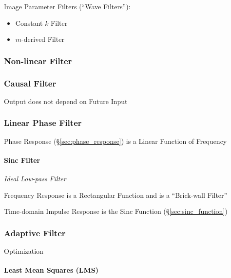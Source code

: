 Image Parameter Filters (``Wave Filters''):
\begin{itemize}
  \item Constant $k$ Filter
  \item $m$-derived Filter
\end{itemize}



\subsubsection{Non-linear Filter}\label{sec:nonlinear_filter}

\subsubsection{Causal Filter}\label{sec:causal_filter}

Output does not depend on Future Input



\subsubsection{Linear Phase Filter}\label{sec:linear_phase}

Phase Response (\S\ref{sec:phase_response}) is a Linear Function of Frequency



\paragraph{Sinc Filter}\label{sec:sinc_filter}\hfill

\emph{Ideal Low-pass Filter}

Frequency Response is a Rectangular Function and is a ``Brick-wall Filter''

Time-domain Impulse Response is the Sinc Function (\S\ref{sec:sinc_function})



\subsubsection{Adaptive Filter}\label{sec:adaptive_filter}

Optimization



\paragraph{Least Mean Squares (LMS)}\label{sec:lms}\hfill

